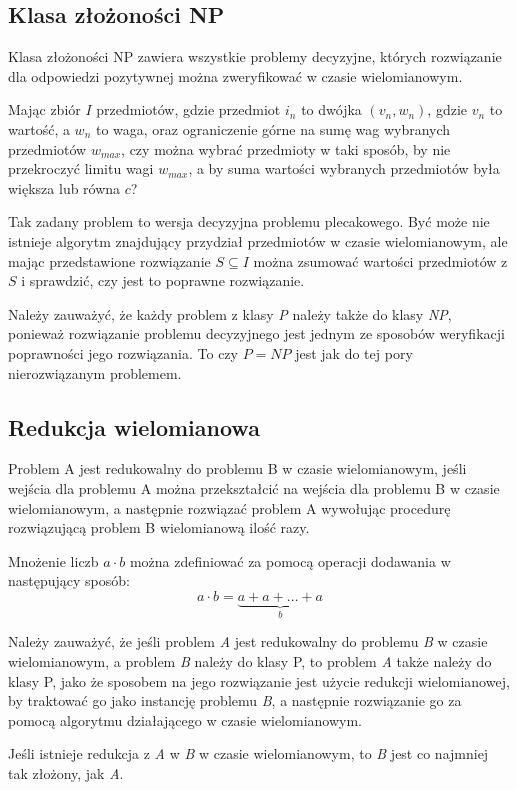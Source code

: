 \subsection{Klasa złożoności NP}
\begin{definition}
    Klasa złożoności NP zawiera wszystkie problemy decyzyjne, których rozwiązanie dla odpowiedzi pozytywnej
można zweryfikować w czasie wielomianowym.
\end{definition}
\begin{example}
    Mając zbiór $I$ przedmiotów, gdzie przedmiot $i_n$ to dwójka $(v_n, w_n)$, gdzie $v_n$ to wartość,
a $w_n$ to waga, oraz ograniczenie górne na sumę wag wybranych przedmiotów $w_{max}$, czy można
wybrać przedmioty w taki sposób, by nie przekroczyć limitu wagi $w_{max}$, a by suma wartości
wybranych przedmiotów była większa lub równa $c$?

    Tak zadany problem to wersja decyzyjna problemu plecakowego. Być może nie istnieje algorytm znajdujący
przydział przedmiotów w czasie wielomianowym, ale mając przedstawione rozwiązanie $S \subseteq I$
można zsumować wartości przedmiotów z $S$ i sprawdzić, czy jest to poprawne rozwiązanie.
\end{example}

    Należy zauważyć, że każdy problem z klasy \textit{P} należy także do klasy \textit{NP}, ponieważ
rozwiązanie problemu decyzyjnego jest jednym ze sposobów weryfikacji poprawności jego rozwiązania.
To czy $P = NP$ jest jak do tej pory nierozwiązanym problemem.


\subsection{Redukcja wielomianowa}
\begin{definition}
    Problem A jest redukowalny do problemu B w czasie wielomianowym, jeśli wejścia dla problemu A
można przekształcić na wejścia dla problemu B w czasie wielomianowym, a następnie rozwiązać problem A
wywołując procedurę rozwiązującą problem B wielomianową ilość razy.
\end{definition}
\begin{example}
    Mnożenie liczb $a \cdot b$ można zdefiniować za pomocą operacji dodawania w następujący sposób:
$$a \cdot b = \underbrace{a + a + \ldots + a}_{b}$$
\end{example}
    Należy zauważyć, że jeśli problem \textit{A} jest redukowalny do problemu \textit{B} w czasie wielomianowym,
a problem \textit{B} należy do klasy P, to problem \textit{A} także należy do klasy P, jako że
sposobem na jego rozwiązanie jest użycie redukcji wielomianowej, by traktować go jako instancję problemu \textit{B},
a następnie rozwiązanie go za pomocą algorytmu działającego w czasie wielomianowym.
\begin{corollary}
    Jeśli istnieje redukcja z \textit{A} w \textit{B} w czasie wielomianowym, to \textit{B} jest
co najmniej tak złożony, jak \textit{A}.
\end{corollary}



